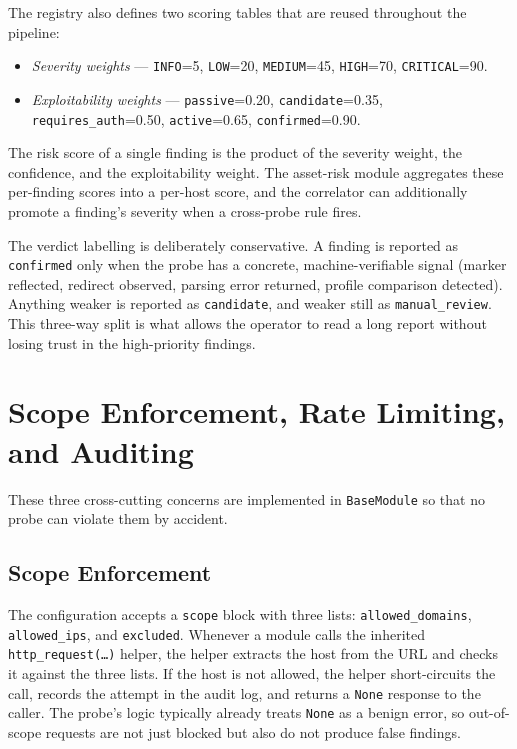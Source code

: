 The registry also defines two scoring tables that are reused throughout the pipeline:

\begin{itemize}
  \item \textit{Severity weights} --- \texttt{INFO}=5, \texttt{LOW}=20, \texttt{MEDIUM}=45, \texttt{HIGH}=70, \texttt{CRITICAL}=90.
  \item \textit{Exploitability weights} --- \texttt{passive}=0.20, \texttt{candidate}=0.35, \texttt{requires\_auth}=0.50, \texttt{active}=0.65, \texttt{confirmed}=0.90.
\end{itemize}

The risk score of a single finding is the product of the severity weight, the confidence, and the exploitability weight. The asset-risk module aggregates these per-finding scores into a per-host score, and the correlator can additionally promote a finding's severity when a cross-probe rule fires.

The verdict labelling is deliberately conservative. A finding is reported as \texttt{confirmed} only when the probe has a concrete, machine-verifiable signal (marker reflected, redirect observed, parsing error returned, profile comparison detected). Anything weaker is reported as \texttt{candidate}, and weaker still as \texttt{manual\_review}. This three-way split is what allows the operator to read a long report without losing trust in the high-priority findings.

\section{Scope Enforcement, Rate Limiting, and Auditing}

These three cross-cutting concerns are implemented in \texttt{BaseModule} so that no probe can violate them by accident.

\subsection{Scope Enforcement}

The configuration accepts a \texttt{scope} block with three lists: \texttt{allowed\_domains}, \texttt{allowed\_ips}, and \texttt{excluded}. Whenever a module calls the inherited \texttt{http\_request(\dots)} helper, the helper extracts the host from the URL and checks it against the three lists. If the host is not allowed, the helper short-circuits the call, records the attempt in the audit log, and returns a \texttt{None} response to the caller. The probe's logic typically already treats \texttt{None} as a benign error, so out-of-scope requests are not just blocked but also do not produce false findings.


